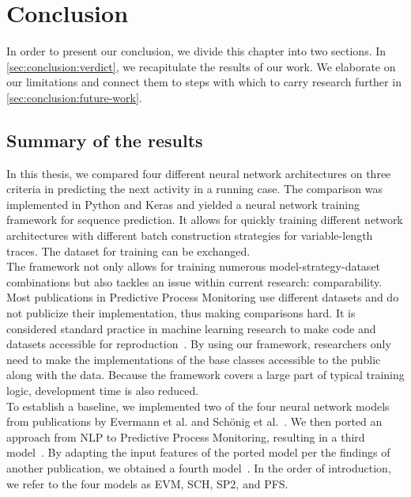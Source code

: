 \chapter{Conclusion} \label{chap:conclusion}
In order to present our conclusion, we divide this chapter into two sections.
In \autoref{sec:conclusion:verdict}, we recapitulate the results of our work.
We elaborate on our limitations and connect them to steps with which to carry research further in \autoref{sec:conclusion:future-work}.

\section{Summary of the results} \label{sec:conclusion:verdict}
In this thesis, we compared four different neural network architectures on three criteria in predicting the next activity in a running case.
The comparison was implemented in Python and Keras and yielded a neural network training framework for sequence prediction.
It allows for quickly training different network architectures with different batch construction strategies for variable-length traces.
The dataset for training can be exchanged.\\

\noindent The framework not only allows for training numerous model-strategy-dataset combinations but also tackles an issue within current research: comparability.
Most publications in Predictive Process Monitoring use different datasets and do not publicize their implementation, thus making comparisons hard.
It is considered standard practice in machine learning research to make code and datasets accessible for reproduction~\cite{russell1995modern}.
By using our framework, researchers only need to make the implementations of the base classes accessible to the public along with the data.
Because the framework covers a large part of typical training logic, development time is also reduced.\\

To establish a baseline, we implemented two of the four neural network models from publications by Evermann et al. and Schönig et al.~\cite{evermann2016, schoenig2018}.
We then ported an approach from NLP to Predictive Process Monitoring, resulting in a third model~\cite{shibata2016bipartite}.
By adapting the input features of the ported model per the findings of another publication, we obtained a fourth model~\cite{klinkmuller2018reliablemonitoring}.
In the order of introduction, we refer to the four models as EVM, SCH, SP2, and PFS.\\

